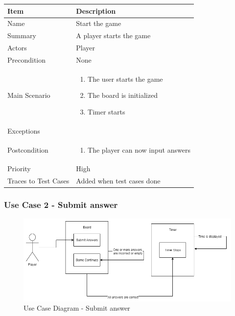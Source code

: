 \documentclass[12pt]{article}
\begin{document}
\begin{center}
\setlength{\tabcolsep}{18pt}
\renewcommand{\arraystretch}{1.3}
\begin{tabular}{ |p{3cm}|p{10cm}| }
    \hline
    \rowcolor{green}
   Item & Description \\
    \hline
    Name & Start the game \\
    \hline
    Summary & A player starts the game \\
    \hline
    Actors & Player \\
    \hline
    Precondition & None \\
    \hline
    Main Scenario &     
    \vspace*{-0.2in}
    \begin{enumerate}
    \item The user starts the game
    \item The board is initialized
    \item Timer starts
    \end{enumerate}  \\
    \hline
    Exceptions &  \\
    \hline
    Postcondition & 
    \vspace*{-0.2in}
    \begin{enumerate}
    \item The player can now input answers
    \end{enumerate}  \\
    \hline
    Priority & High  \\
    \hline
    Traces to Test Cases & Added when test cases done  \\
    \hline
\end{tabular}
\end{center}

\newpage


\subsubsection{Use Case 2 - Submit answer} \label{uc:2}

\begin{figure}[htbp]
    \centering
    \includegraphics[scale=0.6]{SubmitAnswers}
    \caption{Use Case Diagram - Submit answer}
    \label{fig:SubmitAnswers}
\end{figure}
\end{document}
